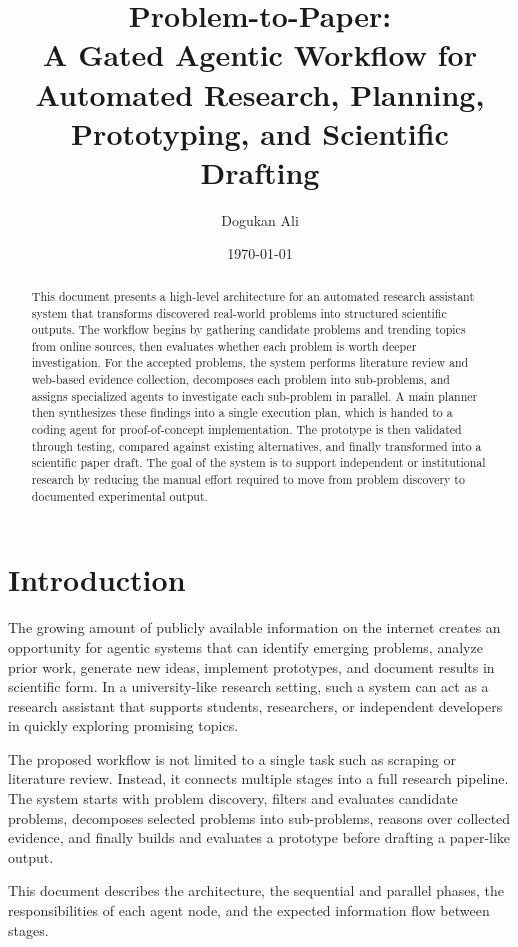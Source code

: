 \documentclass[11pt,a4paper]{article}
\title{Problem-to-Paper: \\ A Gated Agentic Workflow for Automated Research, Planning, Prototyping, and Scientific Drafting}
\author{Dogukan Ali}
\date{\today}
\begin{document}
\maketitle

\begin{abstract}
This document presents a high-level architecture for an automated research assistant system that transforms discovered real-world problems into structured scientific outputs. The workflow begins by gathering candidate problems and trending topics from online sources, then evaluates whether each problem is worth deeper investigation. For the accepted problems, the system performs literature review and web-based evidence collection, decomposes each problem into sub-problems, and assigns specialized agents to investigate each sub-problem in parallel. A main planner then synthesizes these findings into a single execution plan, which is handed to a coding agent for proof-of-concept implementation. The prototype is then validated through testing, compared against existing alternatives, and finally transformed into a scientific paper draft. The goal of the system is to support independent or institutional research by reducing the manual effort required to move from problem discovery to documented experimental output.
\end{abstract}
\section{Introduction}

The growing amount of publicly available information on the internet creates an opportunity for agentic systems that can identify emerging problems, analyze prior work, generate new ideas, implement prototypes, and document results in scientific form. In a university-like research setting, such a system can act as a research assistant that supports students, researchers, or independent developers in quickly exploring promising topics.

The proposed workflow is not limited to a single task such as scraping or literature review. Instead, it connects multiple stages into a full research pipeline. The system starts with problem discovery, filters and evaluates candidate problems, decomposes selected problems into sub-problems, reasons over collected evidence, and finally builds and evaluates a prototype before drafting a paper-like output.

This document describes the architecture, the sequential and parallel phases, the responsibilities of each agent node, and the expected information flow between stages.
\end{document}
